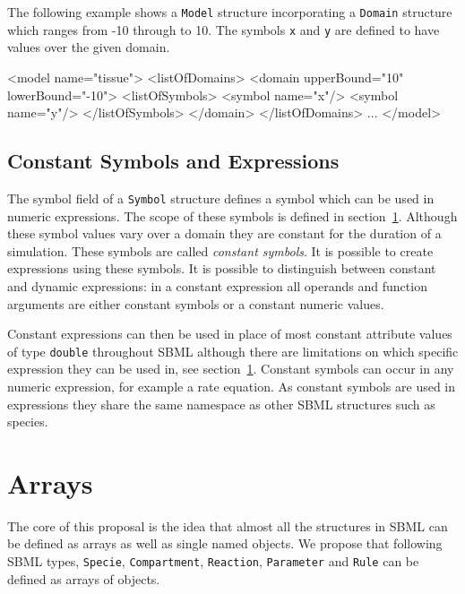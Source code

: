 \documentclass{cekarticle}
\begin{document}
The following example shows a \texttt{Model} structure
incorporating a \texttt{Domain} structure which ranges from -10
through to 10.  The symbols \texttt{x} and \texttt{y} are defined
to have values over the given domain.

\begin{example}
<model name="tissue">
    <listOfDomains>
        <domain upperBound="10" lowerBound="-10">
            <listOfSymbols>
                <symbol name="x"/>
                <symbol name="y"/>
            </listOfSymbols>
        </domain>
    </listOfDomains>
    ...
</model>
\end{example}

\subsection{Constant Symbols and Expressions}
\label{sec:constantExpressions}

The symbol field of a \texttt{Symbol} structure defines a symbol
which can be used in numeric expressions.  The scope of these
symbols is defined in section~\ref{sec:arrays}. Although these
symbol values vary over a domain they are constant for the
duration of a simulation.  These symbols are called
\emph{constant symbols}. It is possible to create expressions
using these symbols. It is possible to distinguish between
constant and dynamic expressions: in a constant expression all
operands and function arguments are either constant symbols or a
constant numeric values.

Constant expressions can then be used in place of most constant
attribute values of type \texttt{double} throughout SBML although
there are limitations on which specific expression they can be
used in, see section~\ref{sec:arrays}. Constant symbols can occur
in any numeric expression, for example a rate equation. As
constant symbols are used in expressions they share the same
namespace as other SBML structures such as species.

\section{Arrays}
\label{sec:arrays}

The core of this proposal is the idea that almost all the
structures in SBML can be defined as arrays as well as single
named objects.  We propose that following SBML types,
\texttt{Specie}, \texttt{Compartment}, \texttt{Reaction},
\texttt{Parameter} and \texttt{Rule} can be defined as arrays of
objects.
\end{document}
